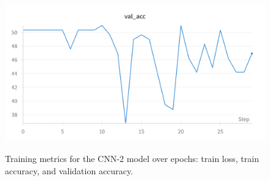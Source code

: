 \documentclass{article}
\begin{document}
\begin{figure}[t]
    \begin{minipage}{0.6\textwidth}
        \centering
        \includegraphics[width=\textwidth]{Images/cnn2_val_acc.png}
        \label{fig:cnn2_val_acc}
    \end{minipage}

    \caption{Training metrics for the CNN-2 model over epochs: train loss, train accuracy, and validation accuracy.}
    \label{fig:cnn2_training_metrics}
\end{figure}
\end{document}

